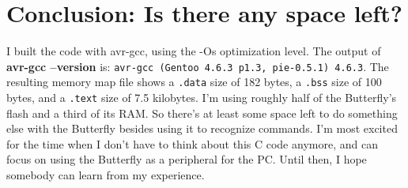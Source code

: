 \clearpage{}
\section{Conclusion: Is there any space left?}
I built the code with avr-gcc, using the -Os optimization level.  The output of \textbf{avr-gcc --version} is: \texttt{avr-gcc (Gentoo 4.6.3 p1.3, pie-0.5.1) 4.6.3}. The resulting memory map file shows a \texttt{.data} size of 182 bytes, a \texttt{.bss} size of 100 bytes, and a \texttt{.text} size of 7.5 kilobytes.  I'm using roughly half of the Butterfly's flash and a third of its RAM.  So there's at least some space left to do something else with the Butterfly besides using it to recognize commands.  I'm most excited for the time when I don't have to think about this C code anymore, and can focus on using the Butterfly as a peripheral for the PC.  Until then, I hope somebody can learn from my experience.





\clearpage{}
\raggedright


